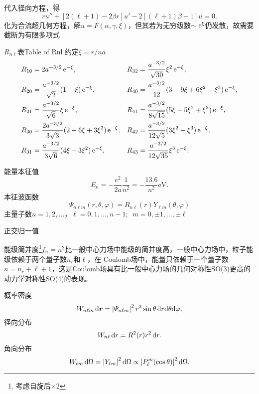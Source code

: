 代入径向方程，得
\[
	ru''+[2(\ell+1)-2\beta r]u'-2[(\ell+1)\beta-1]u=0.
\]
化为合流超几何方程，解$u=F(\alpha,\gamma,\xi)$，但其若为无穷级数$\sim\mathop{}\!\mathrm{e}^{\xi}$仍发散，故需要截断为有限多项式
\begin{example}{$R_{n\ell}$表}{Table of Rnl}
	约定$\xi=r/na$
	\begin{align*}
		R_{10} & =2a^{-3/2}\e{-\xi},&R_{32} & =\frac{a^{-3/2}}{\sqrt{30}}\xi^2\e{-\xi},\\
		R_{20} & =\frac{a^{-3/2}}{\sqrt2}(1-\xi)\e{-\xi},&R_{40} & =\frac{a^{-3/2}}{12}(3-9\xi+6\xi^2-\xi^3)\e{-\xi},\\
		R_{21} & =\frac{a^{-3/2}}{\sqrt6}\xi\e{-\xi},&R_{41} & =\frac{a^{-3/2}}{8\sqrt{15}}(5\xi-5\xi^2+\xi^3)\e{-\xi},\\
		R_{30} & =\frac{2a^{-3/2}}{3\sqrt3}(2-6\xi+3\xi^2)\e{-\xi},&R_{42} & =\frac{a^{-3/2}}{12\sqrt5}(3\xi^2-\xi^3)\e{-\xi},\\
		R_{31} & =\frac{a^{-3/2}}{3\sqrt6}(4\xi-3\xi^2)\e{-\xi},&R_{43} & =\frac{a^{-3/2}}{12\sqrt{35}}\xi^3\e{-\xi}.
	\end{align*}
\end{example}
能量本征值
\[
	E_n=-\frac{e^2}{2a}\frac1{n^2}=-\frac{13.6}{n^2}\si\eV.
\]
本征波函数
\[
	\varPsi_{n\ell m}(r,\theta,\varphi)=R_{n\ell}(r)Y_{\ell m}(\theta,\varphi)
\]
主量子数$n=1,2,\ldots$，$\ell=0,1,\ldots,n-1;\enspace m=0,\pm 1,\ldots,\pm\ell$

正交归一值

能级简并度\footnote{考虑自旋后$\times 2$}$f_n=n^2$比一般中心力场中能级的简并度高，一般中心力场中，粒子能级依赖于两个量子数$n_r$和$\ell$，在
Coulomb场中，能量只依赖于一个量子数$n=n_r+\ell+1$，这是Coulomb场具有比一般中心力场的几何对称性SO(3)更高的动力学对称性SO(4)的表现。

概率密度
\[
	W_{n\ell m}\mathop{}\!\mathrm{d}\bm r=\left\lvert\varPsi_{n\ell m}\right\rvert^2r^2\sin\theta\mathop{}\!\mathrm{d} r\mathrm{d}\theta\mathrm{d}\varphi,
\]
径向分布
\[
	W_{n\ell}\mathop{}\!\mathrm{d} r=R^2(r)r^2\mathop{}\!\mathrm{d} r.
\]
角向分布
\[
	W_{\ell m}\mathop{}\!\mathrm{d}\Omega=\left\lvert Y_{\ell m}\right\rvert^2\mathop{}\!\mathrm{d}\Omega\propto\left\lvert P_\ell^m(\cos\theta)\right\rvert^2\mathop{}\!\mathrm{d}\Omega.
\]
